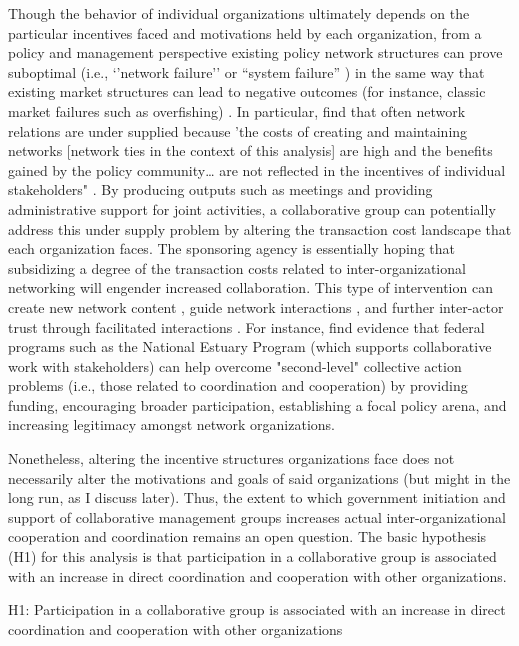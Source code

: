 \documentclass[12pt,a4paper,titlepage]{article}
\begin{document}
Though the behavior of individual organizations ultimately depends on the particular incentives faced and motivations held by each organization, from a policy and management perspective existing policy network structures can prove suboptimal (i.e., `'network failure'' \parencite{schrank2011} or ``system failure'' \parencite{carlsson1997}) in the same way that existing market structures can lead to negative outcomes (for instance, classic market failures such as overfishing) \parencite{weimer2010}. In particular, \textcite{schneider2003} find that often network relations are under supplied because 'the costs of creating and maintaining networks [network ties in the context of this analysis] are high and the benefits gained by the policy community… are not reflected in the incentives of individual stakeholders" \parencite[144]{schneider2003}. By producing outputs such as meetings and providing administrative support for joint activities, a collaborative group can potentially address this under supply problem by altering the transaction cost landscape that each organization faces. The sponsoring agency is essentially hoping that subsidizing a degree of the transaction costs related to inter-organizational networking will engender increased collaboration. This type of intervention can create new network content \parencite{koppenjan2004}, guide network interactions \parencite{kickert1997,mandell1990}, and further inter-actor trust through facilitated interactions \parencite{klijn2010}. For instance, \textcite{schneider2003} find evidence that federal programs such as the National Estuary Program (which supports collaborative work with stakeholders) can help overcome "second-level" collective action problems (i.e., those related to coordination and cooperation) by providing funding, encouraging broader participation, establishing a focal policy arena, and increasing legitimacy amongst network organizations. 

Nonetheless, altering the incentive structures organizations face does not necessarily alter the motivations and goals of said organizations (but might in the long run, as I discuss later). Thus, the extent to which government initiation and support of collaborative management groups increases actual inter-organizational cooperation and coordination remains an open question. The basic hypothesis (H1) for this analysis is that participation in a collaborative group is associated with an increase in direct coordination and cooperation with other organizations. 

\singlespacing
\begin{description}
\item{H1: Participation in a collaborative group is associated with an increase in direct coordination and cooperation with other organizations}
\end{description}
\doublespacing
\end{document}
